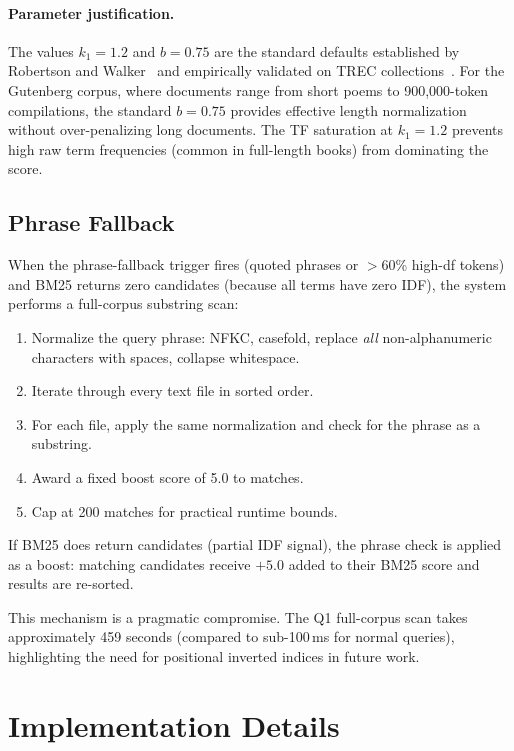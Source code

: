 \documentclass[sigconf,nonacm]{acmart}
\begin{document}
\paragraph{Parameter justification.}
The values $k_1 = 1.2$ and $b = 0.75$ are the standard defaults established by
Robertson and Walker~\cite{robertson1994okapi} and empirically validated on TREC
collections~\cite{robertson1995trec3}.  For the Gutenberg corpus, where
documents range from short poems to 900{,}000-token compilations, the standard
$b = 0.75$ provides effective length normalization without over-penalizing long
documents.  The TF saturation at $k_1 = 1.2$ prevents high raw term
frequencies (common in full-length books) from dominating the score.

\subsection{Phrase Fallback}
When the phrase-fallback trigger fires (quoted phrases or $>$60\% high-df
tokens) and BM25 returns zero candidates (because all terms have zero IDF),
the system performs a full-corpus substring scan:
\begin{enumerate}[nosep]
  \item Normalize the query phrase: NFKC, casefold, replace \emph{all}
        non-alphanumeric characters with spaces, collapse whitespace.
  \item Iterate through every text file in sorted order.
  \item For each file, apply the same normalization and check for the phrase
        as a substring.
  \item Award a fixed boost score of 5.0 to matches.
  \item Cap at 200 matches for practical runtime bounds.
\end{enumerate}
If BM25 does return candidates (partial IDF signal), the phrase check is
applied as a boost: matching candidates receive $+5.0$ added to their BM25
score and results are re-sorted.

This mechanism is a pragmatic compromise.  The Q1 full-corpus scan takes
approximately 459 seconds (compared to sub-100\,ms for normal queries),
highlighting the need for positional inverted indices in future work.

\section{Implementation Details}
\end{document}
